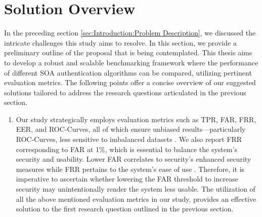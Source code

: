 \section{Solution Overview}
\label{sec: Introduction:Solution Overview}
In the preceding section \ref{sec:Introduction:Problem Description}, we discussed the intricate challenges this study aims to resolve. In this section, we provide a preliminary outline of the proposal that is being contemplated. This thesis aims to develop a robust and scalable benchmarking framework where the performance of different SOA authentication algorithms can be compared, utilizing pertinent evaluation metrics. The following points offer a concise overview of our suggested solutions tailored to address the research questions articulated in the previous section. 
\begin{enumerate}
\item Our study strategically employs evaluation metrics such as TPR, FAR, FRR, EER, and ROC-Curves, all of which ensure unbiased results—particularly ROC-Curves, less sensitive to imbalanced datasets \cite{sugrim2019robust}. We also report FRR corresponding to FAR at 1$\%$, which is essential to balance the system's security and usability. Lower FAR correlates to security's enhanced security measures while FRR pertains to the system's ease of use \cite{arias2023performance}. Therefore, it is imperative to ascertain whether lowering the FAR threshold to increase security may unintentionally render the system less usable. The utilization of all the above mentioned evaluation metrics in our study, provides an effective solution to the first research question outlined in the previous section.     



\end{enumerate}
